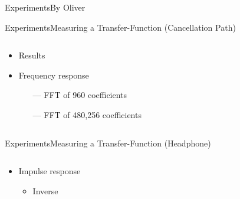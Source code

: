 \begin{frame}{Experiments}{By Oliver}
\begin{frame}{Experiments}{Measuring a Transfer-Function (Cancellation Path)}		
	\begin{columns}
		\begin{column}{0.3\textwidth}
			\begin{itemize}
				\item Results
				\item Frequency response
				\begin{itemize}
					\item[\textcolor{MATLABorange}{---}] FFT of 960 coefficients
					\item[\textcolor{MATLABblue}{---}] FFT of 480,256 coefficients
				\end{itemize}
			\end{itemize}
		\end{column}
		\begin{column}{0.7\textwidth} 
			\begin{figure}[h]
				
			\end{figure}
		\end{column}
	\end{columns}
\end{frame}
\begin{frame}{Experiments}{Measuring a Transfer-Function (Headphone)}		
	\begin{columns}
		\begin{column}{1\textwidth}
			\begin{itemize}
				\item Impulse response
				\begin{itemize}
					\item Inverse
				\end{itemize}
			\end{itemize}
			\begin{figure}[h]
				
			\end{figure}
		\end{column}
	\end{columns}
\end{frame}



\end{frame}
